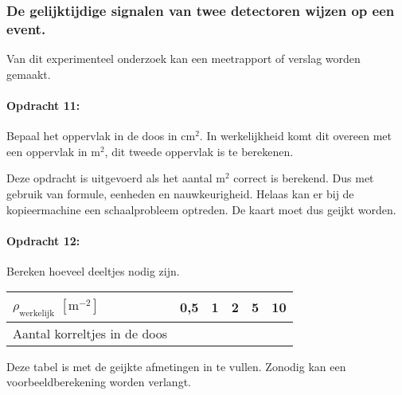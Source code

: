 \subsubsection{De gelijktijdige signalen van twee detectoren wijzen op een event.}

Van dit experimenteel onderzoek kan een meetrapport of verslag worden
gemaakt.

\bigskip{}


\begin{minipage}[t]{1\columnwidth}%

\paragraph{Opdracht 11:}

Bepaal het oppervlak in de doos in $\mathrm{cm^{2}}$. In
werkelijkheid komt dit overeen met een oppervlak in $\mathrm{m^{2}}$,
dit tweede oppervlak is te berekenen.

\bigskip{}

Deze opdracht is uitgevoerd als het aantal $\mathrm{m^{2}}$ correct
is berekend. Dus met gebruik van formule, eenheden en nauwkeurigheid.
Helaas kan er bij de kopieermachine een schaalprobleem optreden. De
kaart moet dus geijkt worden.%
\end{minipage}

\bigskip{}


\begin{minipage}[t]{1\columnwidth}%

\paragraph{Opdracht 12:}

Bereken hoeveel deeltjes nodig zijn.

\smallskip{}

\begin{tabular}{|x{.3\textwidth}|x{.1\textwidth}|x{.1\textwidth}
                |x{.1\textwidth}|x{.1\textwidth}|x{.1\textwidth}|}
    \hline
    $\rho_\textrm{werkelijk}$ $\left[\mathrm{m^{-2}}\right]$ & 0,5 & 1 & 2 & 5 & 10 \\
    \hline
    Aantal korreltjes in de doos &  &  &  &  & \\
    \hline
\end{tabular}

\smallskip{}

Deze tabel is met de geijkte afmetingen in te vullen. Zonodig kan
een voorbeeldberekening worden verlangt.%
\end{minipage}

